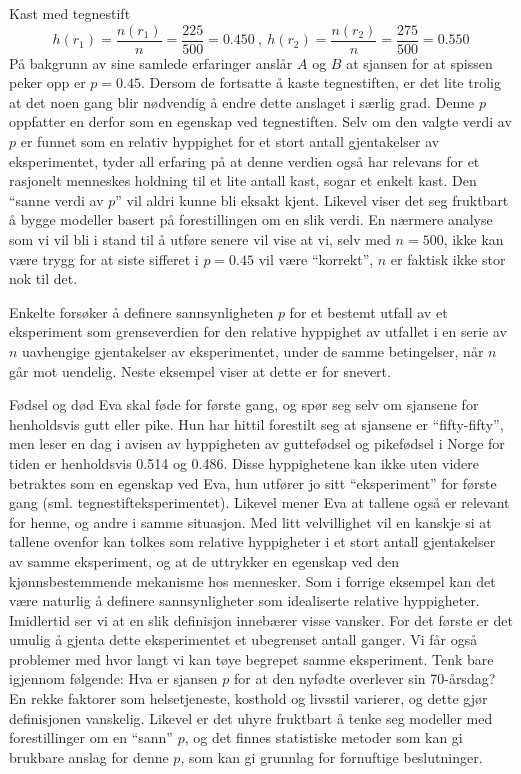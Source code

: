 \begin{eksempel}{Kast med tegnestift}
\[h(r_{1}) = \frac{n(r_{1})}{n} = \frac{225}{500} = 0.450 \ , \ 
 h(r_{2}) = \frac{n(r_{2})}{n} = \frac{275}{500} = 0.550 \] 
På bakgrunn av sine samlede erfaringer anslår $A$ og $B$ at sjansen
for at spissen peker opp er $p=0.45$.  Dersom de fortsatte å kaste
tegnestiften, er det lite trolig at det noen gang blir nødvendig å
endre dette anslaget i særlig grad.  Denne $p$ oppfatter en
derfor som en egenskap ved tegnestiften.  Selv om den valgte verdi av $p$ er
funnet som en relativ hyppighet for et stort antall gjentakelser av
eksperimentet, tyder all erfaring på at denne verdien også har
relevans for et rasjonelt menneskes holdning til et lite antall kast,
sogar et enkelt kast.  Den ``sanne verdi av $p$'' vil aldri kunne bli eksakt
kjent.  Likevel viser det seg fruktbart å bygge modeller basert
på forestillingen om en slik verdi.  En nærmere analyse som vi
vil bli i stand til å utføre senere vil vise at vi, selv med
$n=500$, ikke kan være trygg for at siste sifferet i $p=0.45$ vil
være ``korrekt'', $n$ er faktisk ikke stor nok til det.
\end{eksempel}                                                             

Enkelte forsøker å definere sannsynligheten $p$ for
et bestemt utfall av et eksperiment som grenseverdien for den
relative hyppighet av utfallet i en serie av $n$ uavhengige
gjentakelser av eksperimentet, under de samme betingelser,
når $n$ går mot uendelig.  Neste eksempel viser at dette
er for snevert.\\
                            
\begin{eksempel}{Fødsel og død}
Eva skal føde for første gang, og spør seg selv om sjansene for
henholdsvis gutt eller pike.  Hun har hittil forestilt seg at
sjansene er ``fifty-fifty'', men leser en dag i avisen av
hyppigheten av guttefødsel og pikefødsel i Norge for tiden er  
henholdsvis 0.514 og 0.486.  Disse hyppighetene kan ikke uten
videre betraktes som en egenskap ved Eva, hun utfører jo sitt
``eksperiment'' for første gang (sml. tegnestifteksperimentet). 
Likevel mener Eva at tallene også er relevant for henne, og andre i samme
situasjon. Med litt velvillighet vil en kanskje si at tallene ovenfor kan
tolkes som relative hyppigheter i et stort antall gjentakelser av samme
eksperiment, og at de uttrykker en egenskap ved den kjønnsbestemmende
mekanisme hos mennesker.  Som i forrige eksempel kan det
være naturlig å definere sannsynligheter som idealiserte
relative hyppigheter.  Imidlertid ser vi at en slik definisjon
innebærer visse vansker.  For det første er det
umulig å gjenta dette eksperimentet et ubegrenset antall ganger. 
Vi får også problemer med hvor langt vi kan tøye begrepet samme
eksperiment.  Tenk bare igjennom følgende: 
Hva er sjansen $p$ for at den nyfødte overlever sin 70-årsdag?  En
rekke faktorer som helsetjeneste, kosthold og livsstil varierer, og dette
gjør definisjonen vanskelig. 
Likevel er det uhyre fruktbart å tenke seg modeller
med forestillinger om en ``sann'' $p$, og det finnes statistiske 
metoder som kan gi brukbare anslag for denne $p$, som kan gi grunnlag for
fornuftige beslutninger.
\end{eksempel}

